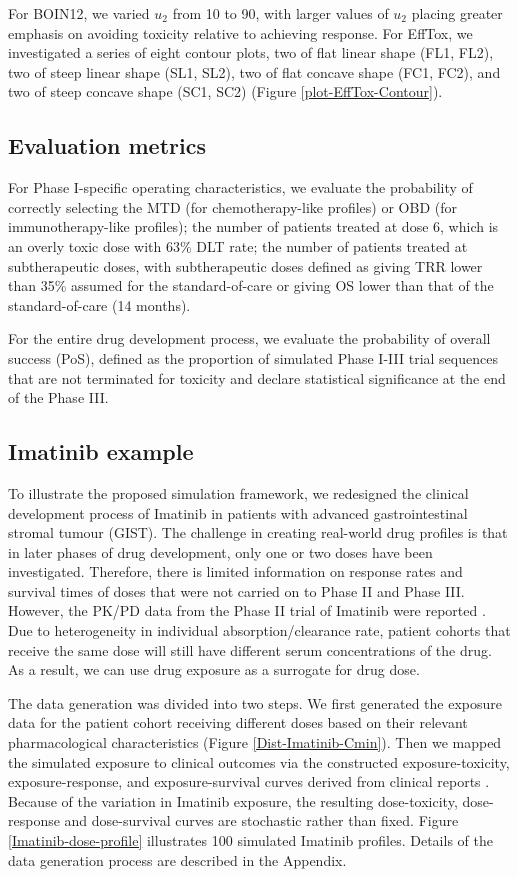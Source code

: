 \documentclass[11pt]{article}
\begin{document}
For BOIN12, we varied $u_2$ from 10 to 90, with larger values of $u_2$ placing greater emphasis on avoiding toxicity relative to achieving response. For EffTox, we investigated a series of eight contour plots, two of flat linear shape (FL1, FL2), two of steep linear shape (SL1, SL2), two of flat concave shape (FC1, FC2), and two of steep concave shape (SC1, SC2) (Figure \ref{plot-EffTox-Contour}).

\subsection{Evaluation metrics}
For Phase I-specific operating characteristics, we evaluate the probability of correctly selecting the MTD (for chemotherapy-like profiles) or OBD (for immunotherapy-like profiles); the number of patients treated at dose 6, which is an overly toxic dose with 63\% DLT rate; the number of patients treated at subtherapeutic doses, with subtherapeutic doses defined as giving TRR lower than 35\% assumed for the standard-of-care or giving OS lower than that of the standard-of-care (14 months).

For the entire drug development process, we evaluate the probability of overall success (PoS), defined as the proportion of simulated Phase I-III trial sequences that are not terminated for toxicity and declare statistical significance at the end of the Phase III.

\subsection{Imatinib example}
To illustrate the proposed simulation framework, we redesigned the clinical development process of Imatinib in patients with advanced gastrointestinal stromal tumour (GIST). The challenge in creating real-world drug profiles is that in later phases of drug development, only one or two doses have been investigated. Therefore, there is limited information on response rates and survival times of doses that were not carried on to Phase II and Phase III. However, the PK/PD data from the Phase II trial of Imatinib were reported \parencite{demetri2009imatinib}. Due to heterogeneity in individual absorption/clearance rate, patient cohorts that receive the same dose will still have different serum concentrations of the drug. As a result, we can use drug exposure as a surrogate for drug dose. 

The data generation was divided into two steps. We first generated the exposure data for the patient cohort receiving different doses based on their relevant pharmacological characteristics (Figure \ref{Dist-Imatinib-Cmin}). Then we mapped the simulated exposure to clinical outcomes via the constructed exposure-toxicity, exposure-response, and exposure-survival curves derived from clinical reports \parencite{demetri2009imatinib}. Because of the variation in Imatinib exposure, the resulting dose-toxicity, dose-response and dose-survival curves are stochastic rather than fixed. Figure \ref{Imatinib-dose-profile} illustrates 100 simulated Imatinib profiles. Details of the data generation process are described in the Appendix. 
\end{document}
